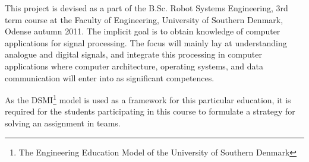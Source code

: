 This project is devised as a part of the B.Sc. Robot Systems Engineering, 3rd term course at the Faculty of Engineering, University of Southern Denmark, Odense autumn 2011. The implicit goal is to obtain knowledge of computer applications for signal processing. The focus will mainly lay at understanding analogue and digital signals, and integrate this processing in computer applications where computer architecture, operating systems, and data communication will enter into as significant competences.

As the DSMI\footnote{The Engineering Education Model of the University of Southern Denmark} model is used as a framework for this particular education, it is required for the students participating in this course to formulate a strategy for solving an assignment in teams.